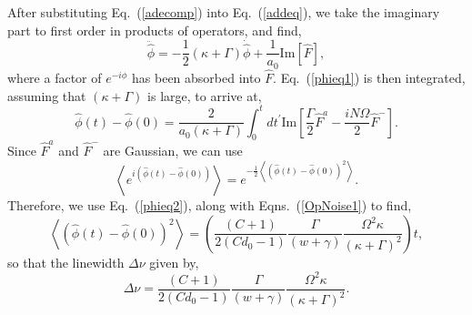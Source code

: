 \documentclass[aps,
twocolumn,
showpacs,
superscriptaddress,groupedaddress]{revtex4}
\begin{document}
After substituting Eq.~(\ref{adecomp}) into Eq.~(\ref{addeq}), we take
the imaginary part to first order in products of operators, and find,
\begin{equation}
\ddot{\hat{\phi}} =
-\frac{1}{2}(\kappa+\Gamma) \dot{\hat{\phi}} +
\frac{1}{a_0} \text{Im} [\hat{F}],
\label{phieq1}
\end{equation}
where a factor of $e^{-i\phi}$ has been absorbed into $\hat{F}$.
Eq.~(\ref{phieq1}) is then integrated, assuming that $(\kappa+\Gamma)$
is large, to arrive at,
\begin{equation}
\hat{\phi}(t) - \hat{\phi}(0) =
\frac{2}{a_0 (\kappa+\Gamma)}
\int_0^t dt^{\prime} \text{Im}
\left[ \frac{\Gamma}{2} \hat{F}^a-\frac{i N \Omega}{2} \hat{F}^-\right].
\label{phieq2}
\end{equation}
Since $ \hat{F}^a$ and $\hat{F}^-$ are Gaussian, we can use
\begin{equation}
\left< e^{i(\hat{\phi}(t) - \hat{\phi}(0))} \right> =
e^{-\frac{1}{2}\left< ( \hat{\phi}(t) - \hat{\phi}(0) )^2 \right>}.
\end{equation}
Therefore, we use Eq.~(\ref{phieq2}), along with Eqns.~(\ref{OpNoise1})
to find,
\begin{equation}
\left<(\hat{\phi}(t) - \hat{\phi}(0))^2 \right> =
\left(\frac{(C+1)}{2(Cd_0-1)} \frac{\Gamma}{(w+\gamma)}
\frac{\Omega^2 \kappa}{(\kappa+\Gamma)^2}\right) t,
\end{equation}
so that the linewidth $\Delta \nu$ given by,
\begin{equation}
\Delta \nu =
\frac{(C+1)}{2(Cd_0-1)} \frac{\Gamma}{(w+\gamma)}
\frac{\Omega^2 \kappa}{(\kappa+\Gamma)^2}.
\label{LWHaken}
\end{equation}



\end{document}
